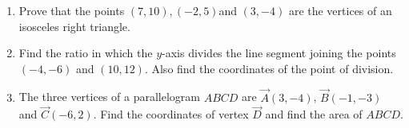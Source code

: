 \begin{enumerate}
\item Prove that the points $(7, 10), (-2, 5) $and $(3, -4)$ are the vertices of an isosceles right triangle.
\item Find the ratio in which the $y$-axis divides the line segment joining the points $(-4,-6)$ and $(10,12)$. Also find the coordinates of the point of division.


\item The three vertices of a parallelogram $ABCD$ are $\vec{A}(3, -4)$, $\vec{B}(-1, -3)$ and $\vec{C}(-6, 2)$. Find the coordinates of vertex $\vec{D}$ and find the area of $ABCD$.
\end{enumerate}
